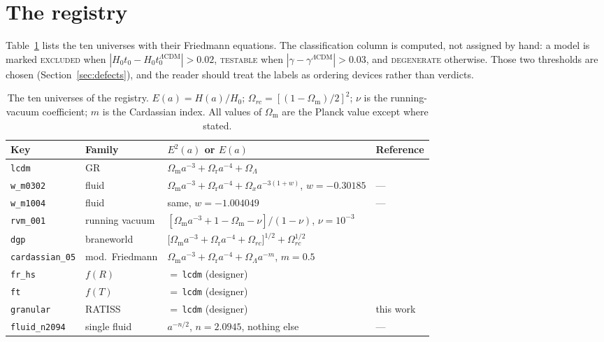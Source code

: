 \documentclass[11pt,a4paper]{article}
\theoremstyle{definition}
\newcommand{\Omm}{\Omega_{\mathrm{m}}}
\newcommand{\Omr}{\Omega_{\mathrm{r}}}
\newcommand{\OmL}{\Omega_{\Lambda}}
\newcommand{\Hzt}{H_0 t_0}
\newcommand{\gamm}{\gamma}
\begin{document}
\section{The registry}
\label{sec:registry}

Table~\ref{tab:registry} lists the ten universes with their Friedmann
equations. The classification column is computed, not assigned by hand: a
model is marked \textsc{excluded} when $|\Hzt - \Hzt^{\Lambda\mathrm{CDM}}| >
0.02$, \textsc{testable} when $|\gamm - \gamm^{\Lambda\mathrm{CDM}}| > 0.03$,
and \textsc{degenerate} otherwise. Those two thresholds are chosen
(Section~\ref{sec:defects}), and the reader should treat the labels as
ordering devices rather than verdicts.

\begin{table}[t]
\centering
\small
\caption{The ten universes of the registry. $E(a) = H(a)/H_0$;
$\Omega_{rc} = [(1-\Omm)/2]^2$; $\nu$ is the running-vacuum coefficient;
$m$ is the Cardassian index. All values of $\Omm$ are the Planck value
except where stated.}
\label{tab:registry}
\begin{tabular}{@{}llll@{}}
\toprule
Key & Family & $E^2(a)$ or $E(a)$ & Reference \\
\midrule
\texttt{lcdm} & GR & $\Omm a^{-3} + \Omr a^{-4} + \OmL$ & \cite{planck2018} \\
\texttt{w\_m0302} & fluid & $\Omm a^{-3} + \Omr a^{-4} + \Omega_x a^{-3(1+w)}$, $w=-0.30185$ & --- \\
\texttt{w\_m1004} & fluid & same, $w=-1.004049$ & --- \\
\texttt{rvm\_001} & running vacuum & $[\Omm a^{-3} + 1 - \Omm - \nu]/(1-\nu)$, $\nu=10^{-3}$ & \cite{sola2019} \\
\texttt{dgp} & braneworld & $\big[\Omm a^{-3} + \Omr a^{-4} + \Omega_{rc}\big]^{1/2} + \Omega_{rc}^{1/2}$ & \cite{dvali2000} \\
\texttt{cardassian\_05} & mod.\ Friedmann & $\Omm a^{-3} + \Omr a^{-4} + \OmL a^{-m}$, $m=0.5$ & \cite{freese2002} \\
\texttt{fr\_hs} & $f(R)$ & $=\,$\texttt{lcdm} (designer) & \cite{husawicki2007} \\
\texttt{ft} & $f(T)$ & $=\,$\texttt{lcdm} (designer) & \cite{linder2010} \\
\texttt{granular} & RATISS & $=\,$\texttt{lcdm} (designer) & this work \\
\texttt{fluid\_n2094} & single fluid & $a^{-n/2}$, $n=2.0945$, nothing else & --- \\
\bottomrule
\end{tabular}
\end{table}
\end{document}
